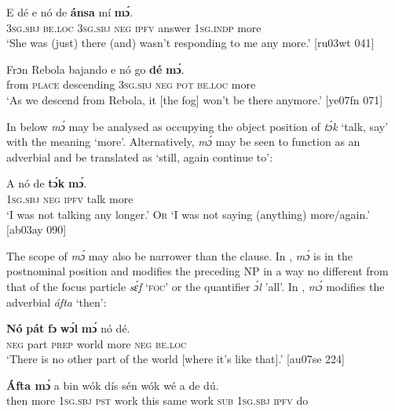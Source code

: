 \ea%
    \label{ex:key:868}
    \gll E    dé    e    nó  de  \textbf{ánsa} mí    \textbf{mɔ́}.\\
\textsc{3sg.sbj}  \textsc{be.loc}  \textsc{3sg.sbj}  \textsc{neg}  \textsc{ipfv}  answer  \textsc{1sg.indp}  more\\

\glt ‘She was (just) there (and) wasn’t responding to me any more.’ [ru03wt 041]
\z


\ea%
    \label{ex:key:869}
    \gll Frɔn    Rebola  bajando    e    nó  go  \textbf{dé}    \textbf{mɔ́}.\\
from  \textsc{place}  descending  \textsc{3sg.sbj}  \textsc{neg}  \textsc{pot}  \textsc{be.loc}  more\\

\glt ‘As we descend from Rebola, it [the fog] won’t be there anymore.’ [ye07fn 071]
\z

In  below \textit{mɔ́} may be analysed as occupying the object position of \textit{tɔ́k} ‘talk, say’ with the meaning ‘more’. Alternatively, \textit{mɔ́} may be seen to function as an adverbial and be translated as ‘still, again continue to’:


\ea%
    \label{ex:key:870}
    \gll A    nó  de  \textbf{tɔ́k}  \textbf{mɔ́}.\\
\textsc{1sg.sbj}  \textsc{neg}  \textsc{ipfv}  talk  more\\

\glt ‘I was not talking any longer.’ O\textsc{r} ‘I was not saying (anything) more/again.’ [ab03ay 090]
\z

The scope of \textit{mɔ́} may also be narrower than the clause. In , \textit{mɔ́} is in the postnominal position and modifies the preceding NP in a way no different from that of the focus particle \textit{sɛ́f} ‘\textsc{foc}’ or the quantifier{\fff} \textit{ɔ́l} ’all’. In , \textit{mɔ́} modifies the adverbial \textit{áfta} ‘then’: 


\ea%
    \label{ex:key:871}
    \gll \textbf{Nó}  \textbf{pát}  \textbf{fɔ}  \textbf{wɔ́l}    \textbf{mɔ́}    nó  dé.\\
\textsc{neg}  part  \textsc{prep}  world  more  \textsc{neg}  \textsc{be.loc}\\

\glt ‘There is no other part of the world [where it’s like that].’ [au07se 224]
\z


\ea%
    \label{ex:key:872}
    \gll \textbf{\'{A}fta    mɔ́}   a    bin  wók    dís  sén    wók 
wé  a    de  dú. \\
then  more  \textsc{1sg.sbj}  \textsc{pst}  work  this  same  work  
\textsc{sub}  \textsc{1sg.sbj}  \textsc{ipfv}  do\\

